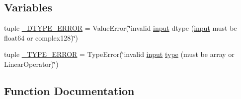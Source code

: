 \subsection*{Variables}
\begin{DoxyCompactItemize}
\item 
tuple \hyperlink{namespacescipy_1_1linalg_1_1interpolative_a2c56643bfab3d408976b53dc4ba6857f}{\+\_\+\+D\+T\+Y\+P\+E\+\_\+\+E\+R\+R\+O\+R} = Value\+Error(\char`\"{}invalid \hyperlink{constants_8h_a1a68120273996c880f8fd414afd17eb4}{input} dtype (\hyperlink{constants_8h_a1a68120273996c880f8fd414afd17eb4}{input} must be float64 or complex128)\char`\"{})
\item 
tuple \hyperlink{namespacescipy_1_1linalg_1_1interpolative_ad59bb08f7183a0e5957d8d528116ce16}{\+\_\+\+T\+Y\+P\+E\+\_\+\+E\+R\+R\+O\+R} = Type\+Error(\char`\"{}invalid \hyperlink{constants_8h_a1a68120273996c880f8fd414afd17eb4}{input} \hyperlink{fftw__dct_8c_a7aead736a07eaf25623ad7bfa1f0ee2d}{type} (must be array or Linear\+Operator)\char`\"{})
\end{DoxyCompactItemize}


\subsection{Function Documentation}
\hypertarget{namespacescipy_1_1linalg_1_1interpolative_a8fbeca3cfa57ca575a66f35299dbe07d}{}
